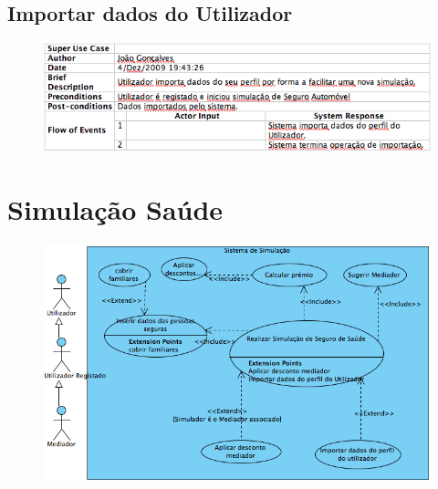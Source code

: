 \pagebreak

\subsection{Importar dados do Utilizador}
\begin{figure}[!htb]
	\centering
	\includegraphics[scale=0.70]{images/Prints/RealizacaoSeguroAutomovel/ImportarDadosPerfilUtilizador.png}
\end{figure}


\section{Simulação Saúde}
\begin{figure}[!htb]
	\centering
	\includegraphics[scale=0.65]{images/Prints/RealizacaoSeguroSaude/SimulacaoSeguroSaude.png}
\end{figure}

\pagebreak

